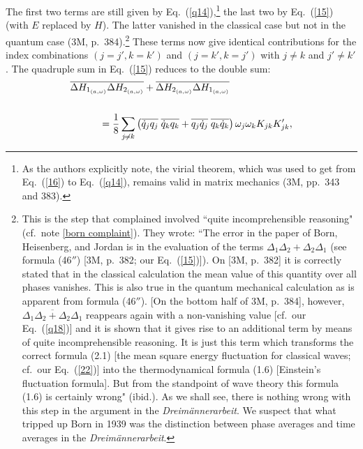 \documentclass[12pt]{elsart}
\begin{document}
The first two terms are still given by Eq.\ (\ref{q14}),\footnote{As the authors explicitly note, the virial theorem, which was used to get from Eq.\ (\ref{16}) to Eq.\ (\ref{q14}),  remains valid in matrix mechanics (3M, pp.\  343 and 383).} the last two by Eq.\ (\ref{15}) (with $E$ replaced by $H$). The latter vanished in the classical case but not in the quantum case (3M, p.\ 384).\footnote{\label{incomprehensible}This is the step that \citet[p.\ 263]{Born and Fuchs 1939a} complained involved ``quite incomprehensible reasoning" (cf.\ note \ref{born complaint}). They wrote: ``The error in the paper of Born, Heisenberg, and Jordan is in the evaluation of the terms $\Delta_1 \Delta_2 + \Delta_2 \Delta_1$ (see formula (46$''$) [3M, p.\ 382; our Eq.\ (\ref{15})]). On [3M, p.\ 382] it is correctly stated that in the classical calculation the mean value of this quantity over all phases vanishes. This is also true in the quantum mechanical calculation as is apparent from formula (46$''$). [On the bottom half of 3M, p.\ 384], however, $\overline{\Delta_1 \Delta_2 + \Delta_2 \Delta_1}$ reappears again with a non-vanishing value [cf.\ our Eq.\ (\ref{q18})] and it is shown that it gives rise to an additional term by means of quite incomprehensible reasoning. It is just this term which transforms the correct formula (2.1) [the mean square energy fluctuation for classical waves; cf.\ our Eq.\ (\ref{22})] into the thermodynamical formula (1.6) [Einstein's fluctuation formula]. But from the standpoint of wave theory this formula (1.6) is certainly wrong" (ibid.). As we shall see, there is nothing wrong with this step in the argument in the {\it Dreim\"annerarbeit}. We suspect that what tripped up Born in 1939 was the distinction between phase averages and time averages in the {\it Dreim\"annerarbeit}.}  These terms now give identical contributions for the index combinations $(j=j', k=k')$ and $(j=k', k=j')$ with $j \neq k$ and $j' \neq k'$. The quadruple sum in Eq.\ (\ref{15}) reduces to the double sum:
\begin{eqnarray}
\lefteqn{ \overline{\Delta H_{1_{(a, \omega)}} \Delta H_{2_{(a, \omega)}}} + \overline{\Delta H_{2_{(a, \omega)}} \Delta H_{1_{(a, \omega)}}} }
& & \nonumber \\
 \label{7a} \\ 
 & & \;\;\;\;\;\;\;\ =  \frac{1}{8} \sum_{ j \neq k} \left(  
\overline{ \dot{q}_j q_j } \; \overline{ \dot{q}_k q_k}
 + \overline{ q_j \dot{q}_j } \; \overline{q_k \dot{q}_k}
 \right) \omega_j \omega_k K_{jk} K'_{jk},
\nonumber
\end{eqnarray}
\end{document}
